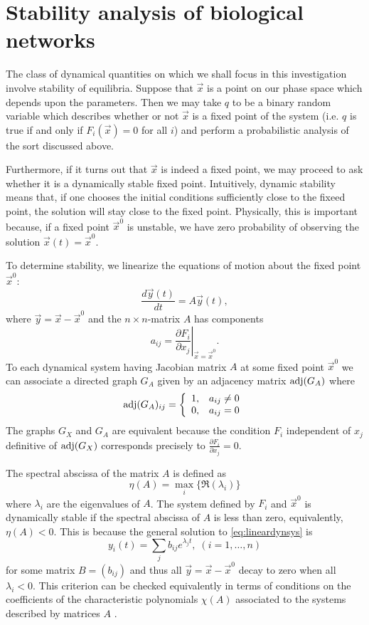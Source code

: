 \section{Stability analysis of biological networks}
The class of dynamical quantities on which we shall focus in this
investigation involve stability of equilibria.  Suppose that $\vec x$
is a point on our phase space which depends upon the parameters.  Then
we may take $q$ to be a binary random variable which describes whether
or not $\vec x$ is a fixed point of the system (i.e. $q$ is true if and only if
$F_i(\vec{x})=0$ for all $i$) and perform a probabilistic analysis
of the sort discussed above.

Furthermore, if it turns out that $\vec x$ is indeed a fixed point, we
may proceed to ask whether it is a dynamically stable fixed point.
Intuitively, dynamic stability means that, if one chooses the initial
conditions sufficiently close to the fixeed point, the solution will
stay close to the fixed point.  Physically, this is important because,
if a fixed point ${\vec x}^0$ is unstable, we have zero probability of
observing the solution ${\vec x}(t) = {\vec x}^0$.

To determine stability, we linearize the equations of motion about the
fixed point $\vec{x}^0$:
\begin{equation}\label{eq:lineardynsys}
\frac{d\vec{y}(t)}{dt} = A \vec{y}(t),
\end{equation}
where $\vec{y} = \vec{x} - \vec{x}^0$ and the $n \times n$-matrix $A$ has components
$$
a_{ij} = \left. \frac{\partial F_i}{\partial x_j} \right|_{\vec{x} = \vec{x}^0}.
$$
To each dynamical system having Jacobian matrix $A$ at some fixed point $\vec{x}^0$ we can associate a directed graph $G_A$ given by an adjacency matrix $\mathrm{adj}(G_A)$ where
 \begin{displaymath}
   \mathrm{adj}(G_A)_{ij} = \left\{
     \begin{array}{lr}
       1, & a_{ij} \neq 0\\
       0, & a_{ij} = 0
     \end{array}
   \right.
\end{displaymath}
The graphs $G_X$ and $G_A$ are equivalent because the condition $F_i$ independent of $x_j$ definitive of $\mathrm{adj}(G_X)$ corresponds precisely to $\frac{\partial F_i}{\partial x_j}=0$.

The spectral abscissa of the matrix $A$ is defined as
$$
\eta(A) = \max_i \{\Re(\lambda_i)\}
$$
where $\lambda_i$ are the eigenvalues of $A$. The system defined by $F_i$ and $\vec{x}^0$ is dynamically stable if the spectral abscissa of $A$ is less than zero, equivalently, $\eta(A) < 0$. This is because the general solution to \ref{eq:lineardynsys} is
$$
y_i(t) = \sum_j b_{ij} e^{\lambda_j t}, \; (i=1,\ldots,n)
$$
for some matrix $B=(b_{ij})$ and thus all $\vec{y} = \vec{x} - \vec{x}^0$ decay to zero when all $\lambda_i < 0$. This criterion can be checked equivalently in terms of conditions on the coefficients of the characteristic polynomials $\chi(A)$ associated to the systems described by matrices $A$ \cite{Gantmacher1959}.

